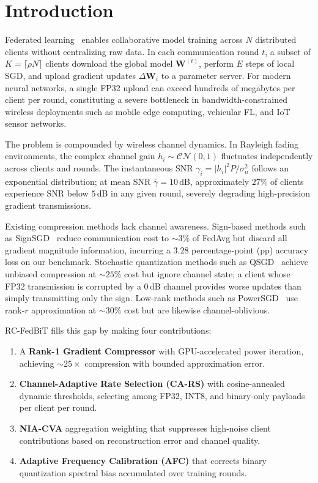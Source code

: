 \documentclass[conference]{IEEEtran}
\begin{document}
\section{Introduction}

Federated learning~\cite{mcmahan2017communication} enables collaborative model training across $N$ distributed clients without centralizing raw data. In each communication round $t$, a subset of $K = \lceil\rho N\rceil$ clients download the global model $\mathbf{W}^{(t)}$, perform $E$ steps of local SGD, and upload gradient updates $\Delta\mathbf{W}_i$ to a parameter server. For modern neural networks, a single FP32 upload can exceed hundreds of megabytes per client per round, constituting a severe bottleneck in bandwidth-constrained wireless deployments such as mobile edge computing, vehicular FL, and IoT sensor networks.

The problem is compounded by wireless channel dynamics. In Rayleigh fading environments, the complex channel gain $h_i \sim \mathcal{CN}(0,1)$ fluctuates independently across clients and rounds. The instantaneous SNR $\gamma_i = |h_i|^2 P / \sigma_n^2$ follows an exponential distribution; at mean SNR $\overline{\gamma} = 10$\,dB, approximately $27\%$ of clients experience SNR below $5$\,dB in any given round, severely degrading high-precision gradient transmissions.

Existing compression methods lack channel awareness. Sign-based methods such as SignSGD~\cite{bernstein2018signsgd} reduce communication cost to $\sim\!3\%$ of FedAvg but discard all gradient magnitude information, incurring a $3.28$ percentage-point (pp) accuracy loss on our benchmark. Stochastic quantization methods such as QSGD~\cite{alistarh2017qsgd} achieve unbiased compression at $\sim\!25\%$ cost but ignore channel state; a client whose FP32 transmission is corrupted by a $0$\,dB channel provides worse updates than simply transmitting only the sign. Low-rank methods such as PowerSGD~\cite{vogels2019powersgd} use rank-$r$ approximation at $\sim\!30\%$ cost but are likewise channel-oblivious.

RC-FedBiT fills this gap by making four contributions:
\begin{enumerate}
    \item A \textbf{Rank-1 Gradient Compressor} with GPU-accelerated power iteration, achieving $\sim\!25\times$ compression with bounded approximation error.
    \item \textbf{Channel-Adaptive Rate Selection (CA-RS)} with cosine-annealed dynamic thresholds, selecting among FP32, INT8, and binary-only payloads per client per round.
    \item \textbf{NIA-CVA} aggregation weighting that suppresses high-noise client contributions based on reconstruction error and channel quality.
    \item \textbf{Adaptive Frequency Calibration (AFC)} that corrects binary quantization spectral bias accumulated over training rounds.
\end{enumerate}
\end{document}
